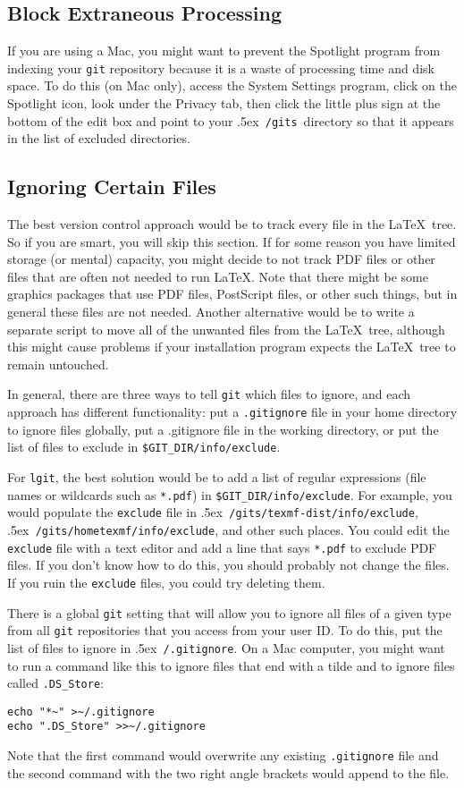 \documentclass{ltxdoc}
\def\bobtilde{\lower.5ex\hbox{\tt \string~}}%
\def\ucmd#1{{\tt {#1}}}
\def\mygits{\bobtilde\ucmd{/gits}}
\begin{document}
\subsection{Block Extraneous Processing}
\label{tune}If you are using a Mac, you might want to prevent the Spotlight program from indexing your \ucmd{git} repository because it is a waste of processing time and disk space. To do this (on Mac only), access the System Settings program, click on the Spotlight icon, look under the Privacy tab, then click the little plus sign at the bottom of the edit box and point to your \mygits\ directory so that it appears in the list of excluded directories.
\subsection{Ignoring Certain Files}
\label{ignore}The best version control approach would be to track every file in the \LaTeX\ tree. So if you are smart, you will skip this section. If for some reason you have limited storage (or mental) capacity, you might decide to not track PDF files or other files that are often not needed to run \LaTeX. Note that there might be some graphics packages that use PDF files, PostScript files, or other such things, but in general these files are not needed.  Another alternative would be to write a separate script to move all of the unwanted files from the \LaTeX\ tree, although this might cause problems if your installation program expects the \LaTeX\ tree to remain untouched.

In general, there are three ways to tell \ucmd{git} which files to ignore, and each approach has different functionality: put a \ucmd{.gitignore} file in your home directory to ignore files globally, put a .gitignore file in the working directory, or put the list of files to exclude in \ucmd{\$GIT\_DIR/info/exclude}.

For \ucmd{lgit}, the best solution would be to add a list of regular expressions (file names or wildcards such as \ucmd{*.pdf}) in \ucmd{\$GIT\_DIR/info/exclude}.  For example, you would populate the \ucmd{exclude} file in \mygits\ucmd{/texmf-dist/info/exclude}, \mygits\ucmd{/hometexmf/info/exclude}, and other such places.  You could edit the \ucmd{exclude} file with a text editor and add a line that says \ucmd{*.pdf} to exclude PDF files.  If you don't know how to do this, you should probably not change the files.  If you ruin the \ucmd{exclude} files, you could try deleting them.

There is a global \ucmd{git} setting that will allow you to ignore all files of a given type from all \ucmd{git} repositories that you access from your user ID. To do this, put the list of files to ignore in \bobtilde\ucmd{/.gitignore}.  On a Mac computer, you might want to run a command like this to ignore files that end with a tilde and to ignore files called \verb|.DS_Store|:
\begin{verbatim}
echo "*~" >~/.gitignore
echo ".DS_Store" >>~/.gitignore
\end{verbatim}
Note that the first command would overwrite any existing \ucmd{.gitignore} file and the second command with the two right angle brackets would append to the file.
\end{document}
